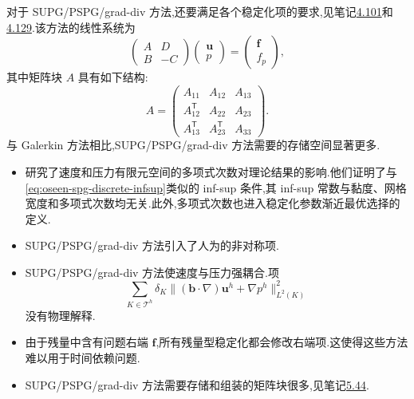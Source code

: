 \begin{note}[实现]
对于 SUPG/PSPG/grad-div 方法,还要满足各个稳定化项的要求,见笔记\hyperref[note:stokes-pspg-implementation]{4.101}和\hyperref[note:stokes-grad-div-implementation]{4.129}.该方法的线性系统为
\begin{equation}\label{eq:oseen-spg-implementation-full-system}
 \begin{pmatrix}A&D\\B&-C\end{pmatrix}
 \begin{pmatrix}\bm{u}\\p\end{pmatrix}
 =\begin{pmatrix}\bm{f}\\f_p\end{pmatrix},
\end{equation}
其中矩阵块 $A$ 具有如下结构:
\begin{equation}\label{eq:oseen-spg-implementation-velocity-block}
 A=
 \begin{pmatrix}
   A_{11}&A_{12}&A_{13}\\
   A_{12}^{\mathsf T}&A_{22}&A_{23}\\
   A_{13}^{\mathsf T}&A_{23}^{\mathsf T}&A_{33}
 \end{pmatrix}.
\end{equation}
与 Galerkin 方法相比,SUPG/PSPG/grad-div 方法需要的存储空间显著更多.
\end{note}

\begin{note}\label{note:oseen-spg-concluding-remarks}
\begin{itemize}
  \item \textcite{LubeRapin2006}研究了速度和压力有限元空间的多项式次数对理论结果的影响.他们证明了与\cref{eq:oseen-spg-discrete-infsup}类似的 inf-sup 条件,其 inf-sup 常数与黏度、网格宽度和多项式次数均无关.此外,多项式次数也进入稳定化参数渐近最优选择的定义.
  \item SUPG/PSPG/grad-div 方法引入了人为的非对称项.
  \item SUPG/PSPG/grad-div 方法使速度与压力强耦合.项
  \[
    \sum_{K\in\mathcal{T}^h}\delta_K
       \|(\bm{b}\cdot\nabla)\bm{u}^h+\nabla p^h\|_{L^2(K)}^2
  \]
  没有物理解释.
  \item 由于残量中含有问题右端 $\bm{f}$,所有残量型稳定化都会修改右端项.这使得这些方法难以用于时间依赖问题.
  \item SUPG/PSPG/grad-div 方法需要存储和组装的矩阵块很多,见笔记\hyperref[note:oseen-spg-implementation]{5.44}.
\end{itemize}
\end{note}

